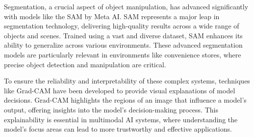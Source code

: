 Segmentation, a crucial aspect of object manipulation, has advanced significantly with models like the SAM by Meta AI. SAM represents a major leap in segmentation technology, delivering high-quality results across a wide range of objects and scenes. Trained using a vast and diverse dataset, SAM enhances its ability to generalize across various environments. These advanced segmentation models are particularly relevant in environments like convenience stores, where precise object detection and manipulation are critical.

To ensure the reliability and interpretability of these complex systems, techniques like Grad-CAM \cite{selvaraju2017grad} have been developed to provide visual explanations of model decisions. Grad-CAM highlights the regions of an image that influence a model’s output, offering insights into the model’s decision-making process. This explainability is essential in multimodal AI systems, where understanding the model’s focus areas can lead to more trustworthy and effective applications.